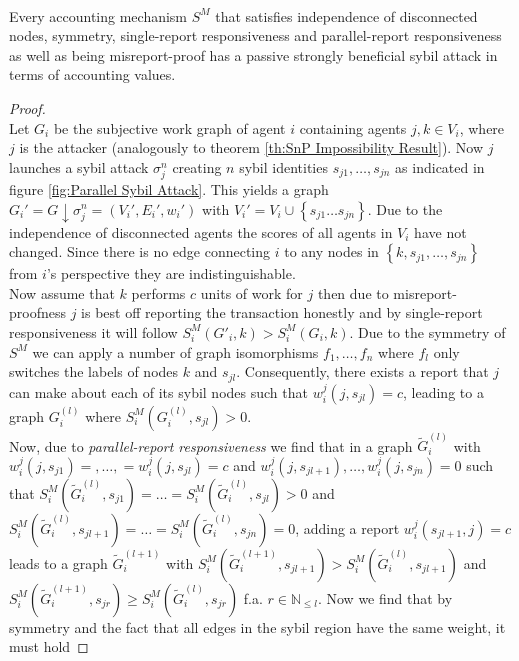 \begin{theorem}[]\ \\
\label{th:Strongly Beneficial Sybil Attack Parallel-Report Responsive}
\noindent{}Every accounting mechanism $S^M$ that satisfies independence of disconnected nodes, symmetry, single-report responsiveness and parallel-report responsiveness as well as being misreport-proof has a passive strongly beneficial sybil attack in terms of accounting values. 
\end{theorem}
\begin{proof}\ \\
\noindent{}Let $G_i$ be the subjective work graph of agent $i$ containing agents $j,k\in{}V_i$, where $j$ is the attacker (analogously to theorem \ref{th:SnP Impossibility Result}). Now $j$ launches a sybil attack $\sigma_j^n$ creating $n$ sybil identities $s_{j1},\ldots,s_{jn}$ as indicated in figure \ref{fig:Parallel Sybil Attack}. This yields a graph $G_i'=G\downarrow\sigma^n_j=(V_i',E_i',w_i')$ with $V_i'=V_i\cup\left\lbrace{}s_{j1}\ldots{}s_{jn}\right\rbrace$. Due to the independence of disconnected agents the scores of all agents in $V_i$ have not changed. Since there is no edge connecting $i$ to any nodes in $\left\lbrace{}k,s_{j1},\ldots,s_{jn}\right\rbrace$ from $i$'s perspective they are indistinguishable. \vspace{1em}\\

\noindent{}Now assume that $k$ performs $c$ units of work for $j$ then due to misreport-proofness $j$ is best off reporting the transaction honestly and by single-report responsiveness it will follow $S^M_i(G'_i,k)>S^M_i(G_i,k)$. Due to the symmetry of $S^M$ we can apply a number of graph isomorphisms $f_1,\ldots,f_n$ where $f_l$ only switches the labels of nodes $k$ and $s_{jl}$. Consequently, there exists a report that $j$ can make about each of its sybil nodes such that $w_i^j(j,s_{jl})=c$, leading to a graph $G_i^{(l)}$ where $S^M_i(G_i^{(l)},s_{jl})>0$. \vspace{1em}\\

\noindent{}Now, due to {\it parallel-report responsiveness} we find that in a graph $\tilde{G}^{(l)}_i$ with $w_i^j(j,s_{j1})=,\ldots,=w_i^j(j,s_{jl})=c$ and $w_i^j(j,s_{jl+1}),\ldots,w_i^j(j,s_{jn})=0$ such that $S^M_i(\tilde{G}^{(l)}_i,s_{j1}) = \ldots{} = S^M_i(\tilde{G}^{(l)}_i,s_{jl})>0$ and $S^M_i(\tilde{G}^{(l)}_i,s_{jl+1}) = \ldots = S^M_i(\tilde{G}^{(l)}_i,s_{jn})=0$, adding a report $w_i^j(s_{jl+1},j)=c$ leads to a graph $\tilde{G}^{(l+1)}_i$ with $S^M_i(\tilde{G}^{(l+1)}_i,s_{jl+1})>S^M_i(\tilde{G}^{(l)}_i,s_{jl+1})$ and $S^M_i(\tilde{G}^{(l+1)}_i,s_{jr})\geq{}S^M_i(\tilde{G}^{(l)}_i,s_{jr})$ f.a. $r\in\mathbb{N}_{\leq{}l}$. Now we find that by symmetry and the fact that all edges in the sybil region have the same weight, it must hold


\end{proof}
